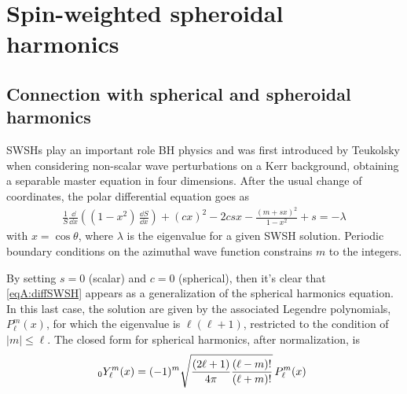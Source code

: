 
\label{AppendixA} %
\chapter{Spin-weighted spheroidal harmonics} %


\section{Connection with spherical and spheroidal harmonics}

SWSHs play an important role BH physics and was first introduced by Teukolsky when considering non-scalar wave perturbations on a Kerr background, obtaining a separable master equation in four dimensions. After the usual change of coordinates, the polar differential equation goes as 
\begin{align}
	\frac{1}{S} \frac{\dd}{\dd x} \left( (1-x^2) \, \frac{\dd S}{\dd x} \right) + (c x)^2 - 2 c s x  -\frac{(m + s x)^2}{1-x^2} + s  = - \lambda 
	\label{eqA:diffSWSH}
\end{align}
with $x=\cos\theta$, where $\lambda$ is the eigenvalue for a given SWSH solution. Periodic boundary conditions on the azimuthal wave function constrains $m$ to the integers.   

By setting $s=0$ (scalar) and $c=0$ (spherical), then it's clear that \eqref{eqA:diffSWSH} appears as a generalization of the spherical harmonics equation. In this last case, the solution are given by the associated Legendre polynomials, $P^m_\ell (x)$, for which the eigenvalue is $\ell(\ell+1)$, restricted to the condition of $|m| \le \ell$. The closed form for spherical harmonics, after normalization, is
\begin{align}
\sts[0]{Y^m}{\ell}(x)=(-1)^{m}{\sqrt {{(2\ell +1) \over 4\pi }{(\ell -m)! \over (\ell +m)!}}}\,P_{\ell }^{m}(x) ~
\label{eqA:SH}
\end{align}